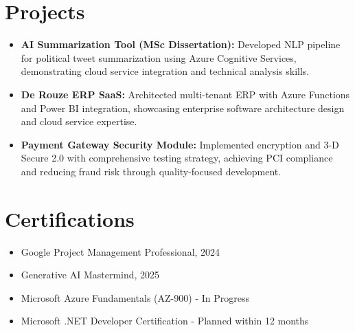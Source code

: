\documentclass[letterpaper,10pt]{article}
\begin{document}
\section{Projects}
\begin{itemize}
    \setlength\itemsep{3pt}
    \item \textbf{AI Summarization Tool (MSc Dissertation):} Developed NLP pipeline for political tweet summarization using Azure Cognitive Services, demonstrating cloud service integration and technical analysis skills.
    \item \textbf{De Rouze ERP SaaS:} Architected multi-tenant ERP with Azure Functions and Power BI integration, showcasing enterprise software architecture design and cloud service expertise.
    \item \textbf{Payment Gateway Security Module:} Implemented encryption and 3-D Secure 2.0 with comprehensive testing strategy, achieving PCI compliance and reducing fraud risk through quality-focused development.
\end{itemize}

\section{Certifications}
\begin{itemize}
    \item Google Project Management Professional, 2024
    \item Generative AI Mastermind, 2025
    \item Microsoft Azure Fundamentals (AZ-900) - In Progress
    \item Microsoft .NET Developer Certification - Planned within 12 months
\end{itemize}

\vspace*{\fill}
\end{document}
